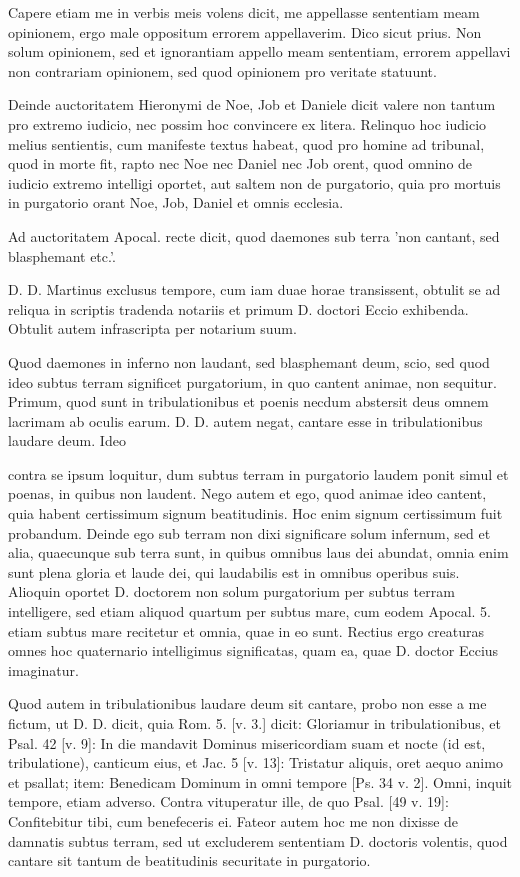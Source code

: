 Capere etiam me in verbis meis volens dicit, me appellasse sententiam meam opinionem, ergo male oppositum errorem appellaverim. Dico sicut prius. Non solum opinionem, sed et ignorantiam appello meam sententiam, errorem appellavi non contrariam opinionem, sed quod opinionem pro veritate statuunt.

Deinde auctoritatem Hieronymi de Noe, Job et Daniele dicit valere non tantum pro extremo iudicio, nec possim hoc convincere ex litera. Relinquo hoc iudicio melius sentientis, cum manifeste textus habeat, quod pro homine ad tribunal, quod in morte fit, rapto nec Noe nec Daniel nec Job orent, quod omnino de iudicio extremo intelligi oportet, aut saltem non de purgatorio, quia pro mortuis in purgatorio orant Noe, Job, Daniel et omnis ecclesia.

Ad auctoritatem Apocal. recte dicit, quod daemones sub terra 'non cantant, sed blasphemant etc.'.

D. D. Martinus exclusus tempore, cum iam duae horae transissent, obtulit se ad reliqua in scriptis tradenda notariis et primum D. doctori Eccio exhibenda. Obtulit autem infrascripta per notarium suum.

Quod daemones in inferno non laudant, sed blasphemant deum, scio, sed quod ideo subtus terram significet purgatorium, in quo cantent animae, non sequitur. Primum, quod sunt in tribulationibus et poenis necdum abstersit deus omnem lacrimam ab oculis earum. D. D. autem negat, cantare esse in tribulationibus laudare deum. Ideo

contra se ipsum loquitur, dum subtus terram in purgatorio laudem ponit simul et poenas, in quibus non laudent. Nego autem et ego, quod animae ideo cantent, quia habent certissimum signum beatitudinis. Hoc enim signum certissimum fuit probandum. Deinde ego sub terram non dixi significare solum infernum, sed et alia, quaecunque sub terra sunt, in quibus omnibus laus dei abundat, omnia enim sunt plena gloria et laude dei, qui laudabilis est in omnibus operibus suis. Alioquin oportet D. doctorem non solum purgatorium per subtus terram intelligere, sed etiam aliquod quartum per subtus mare, cum eodem Apocal. 5. etiam subtus mare recitetur et omnia, quae in eo sunt. Rectius ergo creaturas omnes hoc quaternario intelligimus significatas, quam ea, quae D. doctor Eccius imaginatur.

\marginpar{\small[342]} Quod autem in tribulationibus laudare deum sit cantare, probo non esse a me fictum, ut D. D. dicit, quia Rom. 5. [v. 3.] dicit: Gloriamur in tribulationibus, et Psal. 42 [v. 9]: In die mandavit Dominus misericordiam suam et nocte (id est, tribulatione), canticum eius, et Jac. 5 [v. 13]: Tristatur aliquis, oret aequo animo et psallat; item: Benedicam Dominum in omni tempore [Ps. 34 v. 2]. Omni, inquit tempore, etiam adverso. Contra vituperatur ille, de quo Psal. [49 v. 19]: Confitebitur tibi, cum benefeceris ei. Fateor autem hoc me non dixisse de damnatis subtus terram, sed ut excluderem sententiam D. doctoris volentis, quod cantare sit tantum de beatitudinis securitate in purgatorio.

